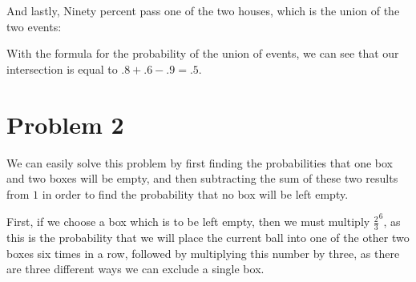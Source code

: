 \documentclass[12pt]{article}
\begin{document}
\begin{center}
\end{center}

And lastly, Ninety percent pass one of the two houses, which is the union of the two events:
\begin{center}
\end{center}

With the formula for the probability of the union of events, we can see that our intersection is equal to $.8+.6-.9 = .5$.

\begin{center}
\end{center}

\section*{Problem 2}
We can easily solve this problem by first finding the probabilities that one box and two boxes will be empty, and then subtracting the sum of these two results from $1$ in order to find the probability that no box will be left empty.

First, if we choose a box which is to be left empty, then we must multiply $\frac{2}{3}^6$, as this is the probability that we will place the current ball into one of the other two boxes six times in a row, followed by multiplying this number by three, as there are three different ways we can exclude a single box.
\end{document}

